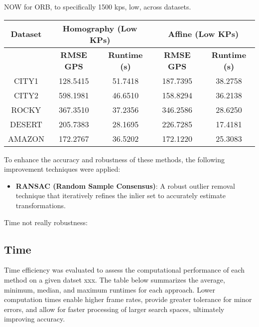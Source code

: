 NOW for ORB, to specifically 1500 kps, low, across datasets. 
\begin{table}[H]
    \centering
    \begin{tabular}{|c|c|c|c|c|}
    \hline
    \textbf{Dataset}   & \multicolumn{2}{c|}{\textbf{Homography (Low KPs)}} & \multicolumn{2}{c|}{\textbf{Affine (Low KPs)}} \\ \hline
    & \textbf{RMSE GPS} & \textbf{Runtime (s)} & \textbf{RMSE GPS} & \textbf{Runtime (s)} \\ \hline
    CITY1 & 128.5415                        & 51.7418           & 187.7395           & 38.2758           \\ \hline
    CITY2 & 598.1981                        & 46.6510           & 158.8294           & 36.2138           \\ \hline
    ROCKY & 367.3510                        & 37.2356           & 346.2586           & 28.6250           \\ \hline
    DESERT & 205.7383                       & 28.1695           & 226.7285           & 17.4181           \\ \hline
    AMAZON & 172.2767                       & 36.5202           & 172.1220           & 25.3083           \\ \hline
    \end{tabular}
\end{table}



To enhance the accuracy and robustness of these methods, the following improvement techniques were applied:
\begin{itemize}
    \item \textbf{RANSAC (Random Sample Consensus)}: A robust outlier removal technique that iteratively refines the inlier set to accurately estimate transformations.
\end{itemize}



Time not really robustness:

\subsection{Time}
Time efficiency was evaluated to assess the computational performance of each method on a given datset xxx. The table below summarizes the average, minimum, median, and maximum runtimes for each approach. Lower computation times enable higher frame rates, provide greater tolerance for minor errors, and allow for faster processing of larger search spaces, ultimately improving accuracy.


